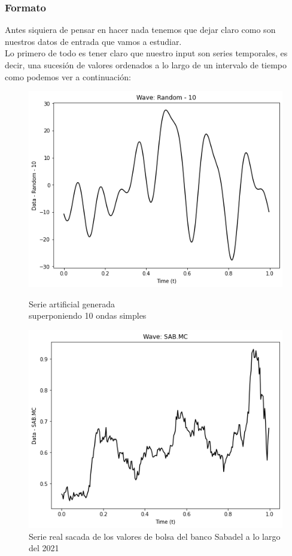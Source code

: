 \documentclass[12pt,a4paper]{article}
\begin{document}
			\subsubsection{Formato}
		Antes siquiera de pensar en hacer nada tenemos que dejar claro como son nuestros datos de entrada que vamos a estudiar.\\
		Lo primero de todo es tener claro que nuestro input son series temporales, es decir, una sucesión de valores ordenados a lo largo de un intervalo de tiempo como podemos ver a continuación:\\
\begin{figure}[H]
\centering
\begin{minipage}{.5\textwidth}
  \centering
  \includegraphics[width=.9\linewidth]{artificial serie}
  \caption{Serie artificial generada \\superponiendo 10 ondas simples\\ \phantom{filler}}
  \label{fig:test1}
\end{minipage}%
\begin{minipage}{.5\textwidth}
  \centering
  \includegraphics[width=.9\linewidth]{real serie}
  \caption{Serie real sacada de los valores de bolsa del banco Sabadel a lo largo del 2021}
  \label{fig:test2}
\end{minipage}
\end{figure}
\end{document}
